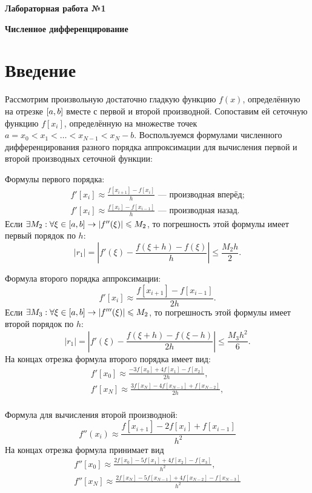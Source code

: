 \begin{center}
    \textbf{\huge Лабораторная работа №1}
    
    \textbf{\large Численное дифференцирование}
\end{center}

\section{Введение}
Рассмотрим произвольную достаточно гладкую функцию $f(x)$, определённую на отрезке $\left[{a, b}\right]$ вместе с первой и второй производной.
Сопоставим ей сеточную функцию $f[x_i]$, определённую на множестве точек $a = x_0 < x_1 < \ldots < x_{N-1} < x_N - b$.
Воспользуемся формулами численного дифференцирования разного порядка аппроксимации для вычисления первой и второй производных сеточной функции:

Формулы первого порядка:
\begin{gather*}
    f'[x_i] \approx \frac{f[x_{i+1}] - f[x_i]}{h} \textrm{ --- производная вперёд;} \\
    f'[x_i] \approx \frac{f[x_i] - f[x_{i-1}]}{h} \textrm{ --- производная назад.}
\end{gather*}
Если $\exists M_2 : \forall \xi \in \left[{a, b}\right] \rightarrow \left| f''(\xi) \right| \leqslant M_2$, то погрешность этой формулы имеет первый порядок по $h$:
\[
    \left| r_1 \right| = \left| f'(\xi) - \frac{f(\xi + h) - f(\xi)}{h} \right| \leqslant \frac{M_2 h}{2}.
\]

Формула второго порядка аппроксимации:
\[
    f'[x_i] \approx \frac{f[x_{i+1}] - f[x_{i-1}]}{2h}.
\]
Если $\exists M_3 : \forall \xi \in \left[{a, b}\right] \rightarrow \left| f'''(\xi) \right| \leqslant M_2$, то погрешность этой формулы имеет второй порядок по $h$:
\[
    \left| r_1 \right| =  \left| f'(\xi) - \frac{f(\xi + h) - f(\xi - h)}{2h}  \right| \leqslant \frac{M_3 h^2}{6}.
\]
На концах отрезка формула второго порядка имеет вид:
\begin{gather*}
    f'[x_0] \approx \frac{-3f[x_0] + 4f[x_1] - f[x_2]}{2h}, \\
    f'[x_N] \approx \frac{3f[x_N] - 4f[x_{N-1}] + f[x_{N-2}]}{2h}, \\
\end{gather*}

Формула для вычисления второй производной:
\[
    f''(x_i) \approx \frac{f[x_{i+1}] - 2f[x_i] + f[x_{i-1}]}{h^2}
\]
На концах отрезка формула принимает вид
\begin{gather*}
    f''[x_0] \approx \frac{2f[x_0] - 5f[x_1] + 4f[x_2] -f[x_3]}{h^2}, \\
    f''[x_N] \approx \frac{2f[x_N] - 5f[x_{N-1}] + 4f[x_{N-2}] -f[x_{N-3}]}{h^2}
\end{gather*}

